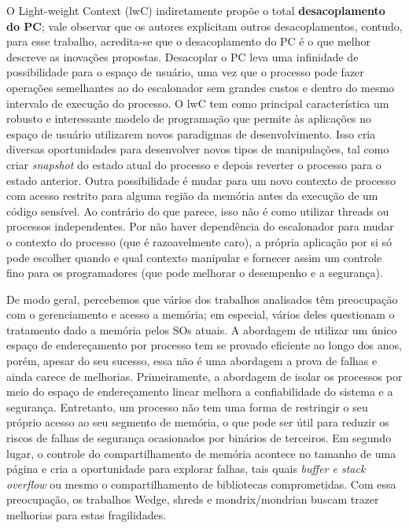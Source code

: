 O Light-weight Context (lwC) indiretamente propõe o total
\textbf{desacoplamento do PC}; vale observar que os autores explicitam outros
desacoplamentos, contudo, para esse trabalho, acredita-se que o desacoplamento
do PC é o que melhor descreve as inovações propostas. Desacoplar o PC leva uma
infinidade de possibilidade para o espaço de usuário, uma vez que o processo
pode fazer operações semelhantes ao do escalonador sem grandes custos e dentro
do mesmo intervalo de execução do processo. O lwC tem como principal
característica um robusto e interessante modelo de programação que permite
às aplicações no espaço de usuário utilizarem novos paradigmas de desenvolvimento.
Isso cria diversas oportunidades para desenvolver novos tipos de manipulações, tal
como criar \emph{snapshot} do estado atual do processo e depois reverter o
processo para o estado anterior. Outra possibilidade é mudar para um novo
contexto de processo com acesso restrito para alguma região da memória antes da
execução de um código sensível. Ao contrário do que parece, isso não é como utilizar threads ou processos
independentes. Por não haver dependência do escalonador para mudar o
contexto do processo (que é razoavelmente caro), a própria aplicação por si
só pode escolher quando e qual contexto manipular e fornecer assim um
controle fino para os programadores (que pode melhorar o desempenho e a
segurança).

De modo geral, percebemos que vários dos trabalhos analisados têm preocupação com o gerenciamento e acesso a
memória; em especial, vários deles questionam o tratamento dado a memória pelos
SOs atuais.  A abordagem de utilizar um único espaço de endereçamento por
processo tem se provado eficiente ao longo dos anos, porém, apesar do seu
sucesso, essa não é uma abordagem a prova de falhas e ainda carece de
melhorias. Primeiramente, a abordagem de isolar os processos por meio do
espaço de endereçamento linear melhora a confiabilidade do sistema e a
segurança. Entretanto, um processo não tem uma forma de restringir o seu próprio
acesso ao seu segmento de memória, o que pode ser útil para reduzir os riscos de
falhas de segurança ocasionados por binários de terceiros. Em segundo lugar, o
controle do compartilhamento de memória acontece no tamanho de uma página e
cria a oportunidade para explorar falhas, tais quais \emph{buffer e stack
overflow} ou mesmo o compartilhamento de bibliotecas comprometidas. Com essa preocupação, os
trabalhos Wedge, shreds e mondrix/mondrian buscam trazer melhorias para estas fragilidades.


